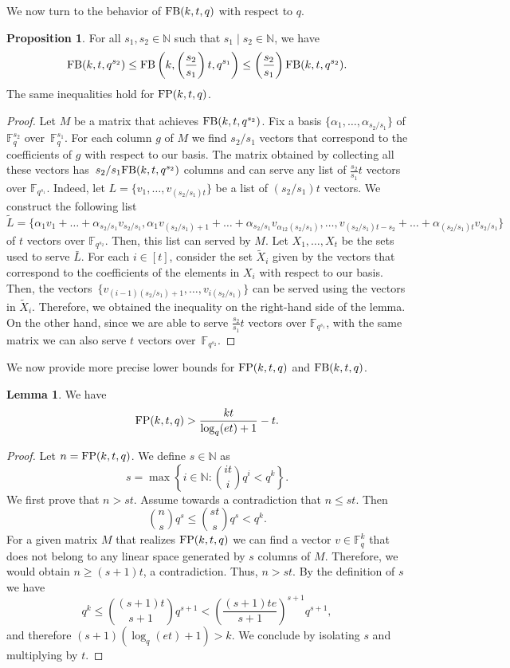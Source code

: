\documentclass[11pt,a4paper]{article}
\theoremstyle{definition}
\newtheorem{proposition}[theorem]{Proposition}
\newtheorem{lemma}[theorem]{Lemma}
\newcommand{\N}{\mathbb N}
\newcommand{\F}{\mathbb F}
\newcommand{\fb}{\textnormal{FB}}
\newcommand{\fp}{\textnormal{FP}}
\begin{document}
We now turn to the behavior of $\fb(k,t,q)$ with respect to $q$.
\begin{proposition}
    For all $s_1,s_2\in\N$ such that $s_1\mid s_2\in\N$, we have
$$\fb(k,t,q^{s_2})\leq\fb\left(k,\left(\frac{s_2}{s_1}\right)t,q^{s_1}\right)\leq\left(\frac{s_2}{s_1}\right)\fb(k,t,q^{s_2}).$$
The same inequalities hold for $\fp(k,t,q)$.
\end{proposition}
\begin{proof}
    Let $M$ be a matrix that achieves $\fb(k,t,q^{s_2})$. Fix a basis $\{\alpha_1,\dots,\alpha_{s_2/s_1}\}$ of $\F_q^{s_2}$ over~$\F_q^{s_1}$. For each column $g$ of $M$ we find $s_2/s_1$ vectors that correspond to the coefficients of $g$ with respect to our basis.
    The matrix obtained by collecting all these vectors has~$s_2/s_1\fb(k,t,q^{s_2})$ columns and can serve any list of $\frac{s_2}{s_1}t$ vectors over $\F_{q^{s_1}}$. Indeed, let $L=\{v_1,\dots, v_{(s_2/s_1)t}\}$ be a list of $(s_2/s_1)t$ vectors. We construct the following list 
    {\small$$\tilde L=\{\alpha_1 v_1+\dots+\alpha_{s_2/s_1}v_{s_2/s_1},\alpha_1 v_{(s_2/s_1)+1}+\dots+\alpha_{s_2/s_1}v_{\alpha_12(s_2/s_1)},\dots,v_{(s_2/s_1)t-s_2}+\dots+\alpha_{(s_2/s_1)t}v_{s_2/s_1}\}$$}
    of $t$ vectors over $\F_{q^{s_2}}$. Then, this list can served by $M$. Let $X_1,\dots, X_t$ be the sets used to serve $\bar L$. For each $i\in[t]$, consider the set $\tilde X_i$ given by the vectors that correspond to the coefficients of the elements in $X_i$ with respect to our basis. Then, the vectors~$\{v_{(i-1)(s_2/s_1)+1},\dots,v_{i(s_2/s_1)}\}$ can be served using the vectors in $\tilde X_i$.
    Therefore, we obtained the inequality on the right-hand side of the lemma. On the other hand, since we are able to serve $\frac{s_2}{s_1}t$ vectors over $\F_{q^{s_1}}$,  with the same matrix we can also serve $t$ vectors over~$\F_{q^{s_2}}$.
\end{proof}
We now provide more precise lower bounds for $\fp(k,t,q)$ and $\fb(k,t,q)$.
\begin{lemma}\label{lemma:lowbound}
    We have
    \begin{equation*}
        \fp(k,t,q)>\frac{kt}{\log_q(et)+1}-t.
    \end{equation*}

\end{lemma}
\begin{proof}
    Let $n=\fp(k,t,q)$. We define $s\in\N$ as
    $$s=\max\left\{i\in\N:\binom{it}{i}q^i<q^k\right\}.$$
    We first prove that $n>st$. Assume towards a contradiction that $n \le st$. Then
    $$\binom{n}{s}q^s \le \binom{st}{s}q^s < q^k.$$
    For a given matrix $M$ that realizes $\fp(k,t,q)$ we can find a vector $v\in\F_q^k$ that does not belong to any linear space generated by $s$ columns of $M$.
    Therefore, we would obtain $n\geq(s+1)t$, a contradiction. Thus, $n > st$. 
    By the definition of $s$ we have
    $$q^k \le \binom{(s+1)t}{s+1}q^{s+1} < \left(\frac{(s+1)te}{s+1}\right)^{s+1}q^{s+1},$$
    and therefore $(s+1)(\log_q(et)+1)>k$. We conclude by isolating $s$ and multiplying by $t$.
\end{proof}
\end{document}
